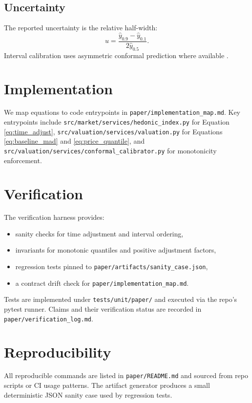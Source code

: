 \documentclass[11pt,a4paper]{article}
\begin{document}
\subsection{Uncertainty}
The reported uncertainty is the relative half-width:
\begin{equation}
\label{eq:uncertainty}
 u = \frac{\hat{y}_{0.9} - \hat{y}_{0.1}}{2\hat{y}_{0.5}}.
\end{equation}
Interval calibration uses asymmetric conformal prediction where available
\cite{RomanoPattersonCandes2019,BarberEtAl2021,AngelopoulosBates2021}.

\section{Implementation}
\label{sec:implementation}
We map equations to code entrypoints in
\texttt{paper/implementation\_map.md}. Key entrypoints include
\texttt{src/market/services/hedonic\_index.py} for Equation
\ref{eq:time_adjust}, \texttt{src/valuation/services/valuation.py} for
Equations \ref{eq:baseline_mad} and \ref{eq:price_quantile}, and
\texttt{src/valuation/services/conformal\_calibrator.py} for monotonicity
enforcement.

\section{Verification}
\label{sec:verification}
The verification harness provides:
\begin{itemize}[leftmargin=1.5em]
  \item sanity checks for time adjustment and interval ordering,
  \item invariants for monotonic quantiles and positive adjustment factors,
  \item regression tests pinned to \texttt{paper/artifacts/sanity\_case.json},
  \item a contract drift check for \texttt{paper/implementation\_map.md}.
\end{itemize}
Tests are implemented under \texttt{tests/unit/paper/} and executed via the
repo's pytest runner. Claims and their verification status are recorded in
\texttt{paper/verification\_log.md}.

\section{Reproducibility}
\label{sec:repro}
All reproducible commands are listed in \texttt{paper/README.md} and sourced
from repo scripts or CI usage patterns. The artifact generator produces a
small deterministic JSON sanity case used by regression tests.
\end{document}
